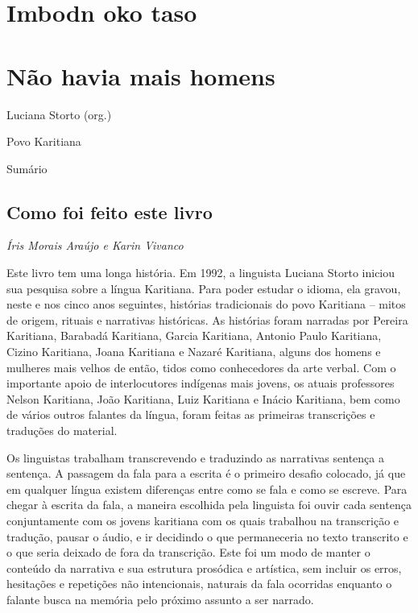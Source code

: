 \section{Imbodn oko taso}\label{imbodn-oko-taso}

\section{Não havia mais homens}\label{nuxe3o-havia-mais-homens}

Luciana Storto (org.)

Povo Karitiana

Sumário

\subsection{Como foi feito este livro}\label{como-foi-feito-este-livro}

\emph{Íris Morais Araújo e Karin Vivanco}

Este livro tem uma longa história. Em 1992, a linguista Luciana Storto
iniciou sua pesquisa sobre a língua Karitiana. Para poder estudar o
idioma, ela gravou, neste e nos cinco anos seguintes, histórias
tradicionais do povo Karitiana -- mitos de origem, rituais e narrativas
históricas. As histórias foram narradas por Pereira Karitiana, Barabadá
Karitiana, Garcia Karitiana, Antonio Paulo Karitiana, Cizino Karitiana,
Joana Karitiana e Nazaré Karitiana, alguns dos homens e mulheres mais
velhos de então, tidos como conhecedores da arte verbal. Com o
importante apoio de interlocutores indígenas mais jovens, os atuais
professores Nelson Karitiana, João Karitiana, Luiz Karitiana e Inácio
Karitiana, bem como de vários outros falantes da língua, foram feitas as
primeiras transcrições e traduções do material.

Os linguistas trabalham transcrevendo e traduzindo as narrativas
sentença a sentença. A passagem da fala para a escrita é o primeiro
desafio colocado, já que em qualquer língua existem diferenças entre
como se fala e como se escreve. Para chegar à escrita da fala, a maneira
escolhida pela linguista foi ouvir cada sentença conjuntamente com os
jovens karitiana com os quais trabalhou na transcrição e tradução,
pausar o áudio, e ir decidindo o que permaneceria no texto transcrito e
o que seria deixado de fora da transcrição. Este foi um modo de manter o
conteúdo da narrativa e sua estrutura prosódica e artística, sem incluir
os erros, hesitações e repetições não intencionais, naturais da fala
ocorridas enquanto o falante busca na memória pelo próximo assunto a ser
narrado.

